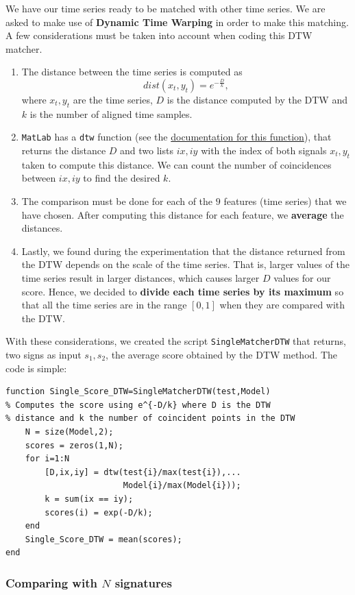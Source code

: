 \documentclass[a4paper]{article}
\def\inline{\lstinline[basicstyle=\ttfamily,keywordstyle={}]}
\begin{document}
{We have our time series ready to be matched with other time series. We are asked to make use of \textbf{Dynamic Time Warping} in order to make this matching. A few considerations must be taken into account when coding this DTW matcher.

\begin{enumerate}
\item The distance between the time series is computed as
\[
dist(x_t,y_t) = e^{-\frac{D}{k}},  
\]
where \(x_t,y_t\) are the time series, \(D\) is the distance computed by the DTW and \(k\) is the number of aligned time samples. 
\item \inline{MatLab} has a \inline{dtw} function (see the \href{https://uk.mathworks.com/help/signal/ref/dtw.html}{documentation for this function}), that returns the distance \(D\) and two lists \(ix,iy\) with the index of both signals \(x_t,y_t\) taken to compute this distance. We can count the number of coincidences between \(ix,iy\) to find the desired \(k\).
\item The comparison must be done for each of the \(9\) features (time series) that we have chosen. After computing this distance for each feature, we \textbf{average} the distances.
\item Lastly, we found during the experimentation that the distance returned from the DTW depends on the scale of the time series. That is, larger values of the time series result in larger distances, which causes larger \(D\) values for our score. Hence, we decided to \textbf{divide each time series by its maximum} so that all the time series are in the range \([0,1]\) when they are compared with the DTW. 
\end{enumerate}
With these considerations, we created the script \inline{SingleMatcherDTW} that returns, two signs as input \(s_1,s_2\), the average score obtained by the DTW method. The code is simple:

\begin{verbatim}
function Single_Score_DTW=SingleMatcherDTW(test,Model)
% Computes the score using e^{-D/k} where D is the DTW
% distance and k the number of coincident points in the DTW
    N = size(Model,2);
    scores = zeros(1,N);
    for i=1:N
        [D,ix,iy] = dtw(test{i}/max(test{i}),...
                        Model{i}/max(Model{i}));
        k = sum(ix == iy);
        scores(i) = exp(-D/k);
    end
    Single_Score_DTW = mean(scores);
end
\end{verbatim}

\subsubsection*{Comparing with \(N\) signatures}

}
\end{document}
